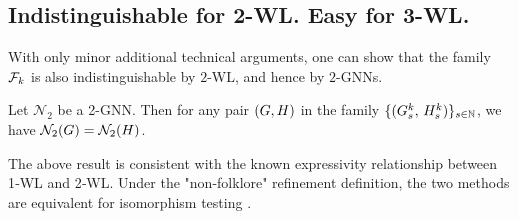 \subsection{Indistinguishable for 2-WL. Easy for 3-WL.}

With only minor additional technical arguments, one can show that the family $\mathcal{F}_k$ is also indistinguishable by $2$-WL, and hence by $2$-GNNs.

\begin{theorem}\label{thm:Ind2-GNN}
    Let $\mathcal{N}_2$ be a 2-GNN. Then for any pair $(G,H)$ in the family
    $\{(G_s^k,\, H_s^k)\}_{s \in \mathbb{N}}$, we have $\mathcal{N}_2(G)=\mathcal{N}_2(H)$.
\end{theorem}

The above result is consistent with the known expressivity relationship between 1‑WL and 2‑WL. Under the "non-folklore" refinement definition, the two methods are equivalent for isomorphism testing \citep{inproceedings}.



